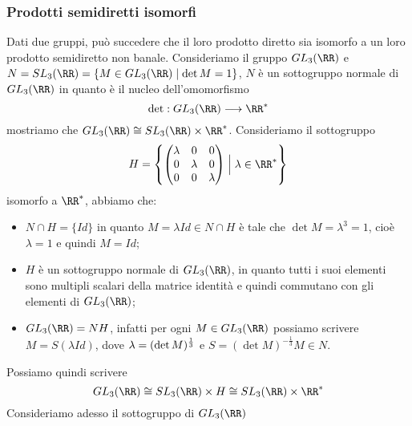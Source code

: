 \documentclass[11pt]{scrartcl}
\begin{document}
	\subsubsection{Prodotti semidiretti isomorfi}
	
	Dati due gruppi, può succedere che il loro prodotto diretto sia isomorfo a 
	un loro prodotto semidiretto non banale.\newline
	Consideriamo il gruppo $GL_3(\RR)$ e $N = SL_3(\RR) = \{M \in GL_3(\RR)
	\mid \det M = 1\}$, $N$ è un sottogruppo normale di $GL_3(\RR)$ in quanto è il nucleo
	dell'omomorfismo
	\[
	\det: GL_3(\RR) \longrightarrow \RR^*
	\]
	mostriamo che $GL_3(\RR) \cong SL_3(\RR)\times\RR^*$. Consideriamo il sottogruppo
	\[
	H = \left\{\begin{pmatrix}
		\lambda & 0 & 0\\
		0 & \lambda & 0\\
		0 & 0 & \lambda
	\end{pmatrix}\Bigm| \lambda \in \RR^* \right\}
	\]isomorfo a $\RR^*$, abbiamo che:
	
	\begin{itemize}
		\item $N \cap H = \{Id\}$ in quanto $M = \lambda Id \in N\cap H$ è tale
		che $\det M = \lambda^3 = 1$, cioè $\lambda = 1$ e quindi $M = Id$;
		\item $H$ è un sottogruppo normale di $GL_3(\RR)$, in quanto tutti i suoi elementi
		sono multipli scalari della matrice identità e quindi commutano con gli
		elementi di $GL_3(\RR)$;
		\item $GL_3(\RR) = NH$, infatti per ogni $M \in GL_3(\RR)$ possiamo scrivere $M = S(\lambda Id)$,
		dove $\lambda = \nolinebreak(\det M)^{\frac 1 3}$ e $S = (\det M)^{-\frac 1 3} M \in N$.
	\end{itemize}
	
	Possiamo quindi scrivere 
	\[
	GL_3(\RR) \cong SL_3(\RR) \times H \cong SL_3(\RR)\times \RR^*
	\]
	Consideriamo adesso il sottogruppo di $GL_3(\RR)$
	
\end{document}
